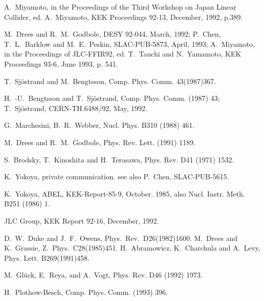 \begin{thebibliography}{99}
%
A.~Miyamoto, in the {\elevenit Proceedings of the Third Workshop
on Japan Linear Collider}, ed. A.~Miyamoto, 
{\elevenit KEK Proceedings 92-13}, December, 1992, p.389.

%

M.~Drees and R.~M.~Godbole,
{\elevenit DESY 92-044}, March, 1992;
P.~Chen, T.~L.~Barklow  and M.~E.~Peskin, 
{\elevenit SLAC-PUB-5873}, April, 1993;
A.~Miyamoto, in the {\elevenit Proceedings of JLC-FFIR92}, 
ed. T.~Tauchi and N.~Yamamoto, 
{\elevenit KEK Proceedings 93-6}, June 1993, p. 541.

%
T.~Sj\"{o}strand and M.~Bengtsson, Comp. Phys. Comm. 43(1987)367.
%

%
H.~-U.~Bengtsson and T.~Sj\"{o}strand,
{\elevenit Comp. Phys. Comm.} {} (1987) 43;
T.~Sj\"{o}strand, {\elevenit CERN-TH.6488/92}, May, 1992. 

%
G.~Marchesini, B.~R.~Webber, {\elevenit Nucl. Phys.}
{\elevenbf B310} (1988) 461.

%
M.~Drees and R.~M.~Godbole, 
{\elevenit Phys. Rev. Lett.} {} (1991) 1189.
%

%
S.~Brodsky, T.~Kinoshita and H.~Terasawa,
{\elevenit Phys. Rev.} {\elevenbf D41} (1971) 1532.


K.~Yokoya, private communication. see also
P.~Chen, SLAC-PUB-5615.
%

K.~Yokoya, ABEL, KEK-Report-85-9, October. 1985, 
also Nucl. Instr. Meth. B251 (1986) 1.
%

%
JLC Group, {\elevenit KEK Report 92-16}, December, 1992.


%
D.~W.~Duke and J.~F.~Owens, Phys.~Rev.~D26(1982)1600.
%
M.~Drees and K.~Grassie, Z.~Phys.~C28(1985)451.
%
H.~Abramowicz, K.~Charchula and A.~Levy, 
Phys. Lett. B269(1991)458.
%
%


%
M.~Gl\"{u}ck, E.~Reya, and A.~Vogt,
{\elevenit Phys. Rev.} {\elevenbf D46} (1992) 1973.

H.~Plothow-Besch, 
{\elevenit Comp. Phys. Comm.} {} (1993) 396.


\end{thebibliography}

